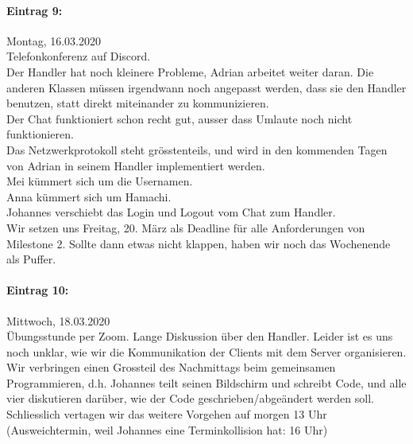 \documentclass[12pt]{article}
\begin{document}
\paragraph{Eintrag 9:}
Montag, 16.03.2020\\
Telefonkonferenz auf Discord.\\
Der Handler hat noch kleinere Probleme, Adrian arbeitet weiter daran. Die anderen Klassen m\"ussen irgendwann noch angepasst werden, dass sie den Handler benutzen, statt direkt miteinander zu kommunizieren.\\
Der Chat funktioniert schon recht gut, ausser dass Umlaute noch  nicht funktionieren.\\
Das Netzwerkprotokoll steht gr\"osstenteils, und wird in den kommenden Tagen von Adrian in seinem Handler implementiert werden.\\
Mei k\"ummert sich um die Usernamen.\\
Anna k\"ummert sich um Hamachi.\\
Johannes verschiebt das Login und Logout vom Chat zum Handler.\\
Wir setzen uns Freitag, 20. M\"arz als Deadline f\"ur alle Anforderungen von Milestone 2. Sollte dann etwas nicht klappen, haben wir noch das Wochenende als Puffer.

\paragraph{Eintrag 10:}
Mittwoch, 18.03.2020\\
\"Ubungsstunde per Zoom. Lange Diskussion \"uber den Handler. Leider ist es uns noch unklar, wie wir die Kommunikation der Clients mit dem Server organisieren. Wir verbringen einen Grossteil des Nachmittags beim gemeinsamen Programmieren, d.h. Johannes teilt seinen Bildschirm und schreibt Code, und alle vier diskutieren dar\"uber, wie der Code geschrieben/abge\"andert werden soll.\\
Schliesslich vertagen wir das weitere Vorgehen auf morgen 13 Uhr (Ausweichtermin, weil Johannes eine Terminkollision hat: 16 Uhr)
\end{document}
